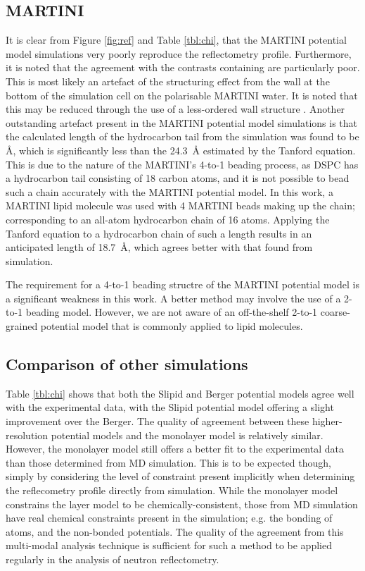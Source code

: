 \documentclass[amsmath,amssymb,twocolumn,superscriptaddress]{revtex4-1}
\begin{document}
\subsection{MARTINI}
It is clear from Figure \ref{fig:ref} and Table \ref{tbl:chi}, that the
MARTINI potential model simulations very poorly reproduce the reflectometry
profile.
Furthermore, it is noted that the agreement with the contrasts containing
 are particularly poor.
This is most likely an artefact of the structuring effect from the wall at
the bottom of the simulation cell on the polarisable MARTINI water.
It is noted that this may be reduced through the use of a less-ordered wall
structure \cite{koutsioubas_combined_2016}.
Another outstanding artefact present in the MARTINI potential model
simulations is that the calculated length of the hydrocarbon tail from the
simulation was found to be
\si{\angstrom}, which is
significantly less than the \SI{24.3}{\angstrom} estimated by the Tanford
equation.
This is due to the nature of the MARTINI's 4-to-1 beading process, as DSPC
has a hydrocarbon tail consisting of 18 carbon atoms, and it is not possible
to bead such a chain accurately with the MARTINI potential model.
In this work, a MARTINI lipid molecule was used with 4 MARTINI beads making
up the chain; corresponding to an all-atom hydrocarbon chain of 16 atoms.
Applying the Tanford equation to a hydrocarbon chain of such a length
results in an anticipated length of \SI{18.7}{\angstrom}, which agrees
better with that found from simulation.

The requirement for a 4-to-1 beading structre of the MARTINI potential model
is a significant weakness in this work.
A better method may involve the use of a 2-to-1 beading model.
However, we are not aware of an off-the-shelf 2-to-1 coarse-grained
potential model that is commonly applied to lipid molecules.

\subsection{Comparison of other simulations}
Table \ref{tbl:chi} shows that both the Slipid and Berger potential models
agree well with the experimental data, with the Slipid potential model
offering a slight improvement over the Berger.
The quality of agreement between these higher-resolution potential models
and the monolayer model is relatively similar.
However, the monolayer model still offers a better fit to the experimental
data than those determined from MD simulation.
This is to be expected though, simply by considering the level of
constraint present implicitly when determining the reflecometry profile
directly from simulation.
While the monolayer model constrains the layer model to be
chemically-consistent, those from MD simulation have real chemical
constraints present in the simulation; e.g. the bonding of atoms, and
the non-bonded potentials.
The quality of the agreement from this multi-modal analysis technique
is sufficient for such a method to be applied regularly in the analysis
of neutron reflectometry.
\end{document}
